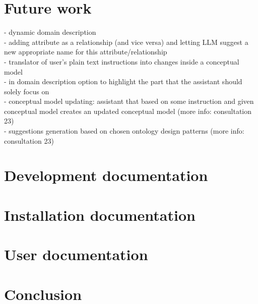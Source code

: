\chapter{Future work}

- dynamic domain description \\

- adding attribute as a relationship (and vice versa) and letting LLM suggest a new appropriate name for this attribute/relationship \\

- translator of user's plain text instructions into changes inside a conceptual model \\

- in domain description option to highlight the part that the assistant should solely focus on \\

- conceptual model updating: assistant that based on some instruction and given conceptual model creates an updated conceptual model (more info: consultation 23) \\

- suggestions generation based on chosen ontology design patterns (more info: consultation 23) \\

\chapter{Development documentation}
\chapter{Installation documentation}
\chapter{User documentation}
\chapter{Conclusion}